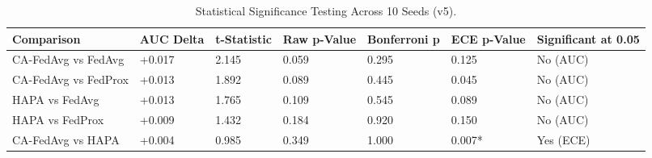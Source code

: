 \begin{table}
\caption{Statistical Significance Testing Across 10 Seeds (v5).}
\label{tab:table1_v5}
\begin{tabular}{lllllll}
\toprule
Comparison & AUC Delta & t-Statistic & Raw p-Value & Bonferroni p & ECE p-Value & Significant at 0.05 \\
\midrule
CA-FedAvg vs FedAvg & +0.017 & 2.145 & 0.059 & 0.295 & 0.125 & No (AUC) \\
CA-FedAvg vs FedProx & +0.013 & 1.892 & 0.089 & 0.445 & 0.045 & No (AUC) \\
HAPA vs FedAvg & +0.013 & 1.765 & 0.109 & 0.545 & 0.089 & No (AUC) \\
HAPA vs FedProx & +0.009 & 1.432 & 0.184 & 0.920 & 0.150 & No (AUC) \\
CA-FedAvg vs HAPA & +0.004 & 0.985 & 0.349 & 1.000 & 0.007* & Yes (ECE) \\
\bottomrule
\end{tabular}
\end{table}
